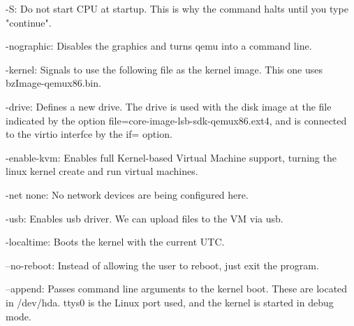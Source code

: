 \documentclass[letterpaper,10pt,fleqn]{article}
\begin{document}
-S: Do not start CPU at startup. This is why the command halts until you type "continue".

-nographic: Disables the graphics and turns qemu into a command line. 

-kernel: Signals to use the following file as the kernel image. This one uses bzImage-qemux86.bin.

-drive: Defines a new drive. The drive is used with the disk image at the file indicated by the option file=core-image-lsb-sdk-qemux86.ext4, and is connected to the virtio interfce by the if= option. 

-enable-kvm: Enables full Kernel-based Virtual Machine support, turning the linux kernel create and run virtual machines.

-net none: No network devices are being configured here. 

-usb: Enables usb driver. We can upload files to the VM via usb. 

-localtime: Boots the kernel with the current UTC.

--no-reboot: Instead of allowing the user to reboot, just exit the program. 

--append: Passes command line arguments to the kernel boot. These are located in /dev/hda. ttys0 is the Linux port used, and the kernel is started in debug mode.
 
\end{document}
